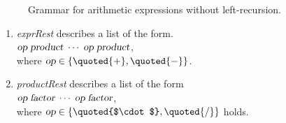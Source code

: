 \begin{figure}[htbp]
  \begin{center}    
  \end{center}
  \caption{Grammar for arithmetic expressions without left-recursion.}
  \label{fig:Expr2}
\end{figure}

\begin{enumerate}
\item \textsl{exprRest} describes a list of the form.
      \\[0.2cm]
      \hspace*{1.3cm}
      $\textsl{op} \;\textsl{product} \;\cdots \;\textsl{op}\; \textsl{product}$,
      \\[0.2cm]
      where $\textsl{op} \in \{ \quoted{+}, \quoted{-} \}$.
\item \textsl{productRest} describes a list of the form
      \\[0.2cm]
      \hspace*{1.3cm}
      $\textsl{op} \;\textsl{factor} \;\cdots \;\textsl{op} \;\textsl{factor}$,
      \\[0.2cm]
      where $\textsl{op} \in \{ \quoted{$\cdot$}, \quoted{/} \}$ holds. 
\end{enumerate}
\pagebreak

